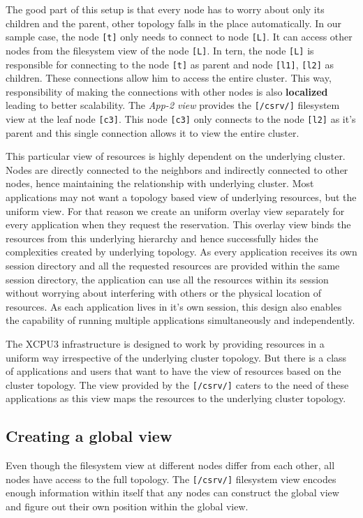 The good part of this setup is that every node has to worry about only its children
and the parent, other topology falls in the place automatically. In our sample case, 
the node \texttt{[t]} only needs to connect to node \texttt{[L]}.  It can access other nodes
from the filesystem view of the node \texttt{[L]}.  In tern, the node \texttt{[L]} is responsible
for connecting to the node \texttt{[t]} as parent and node \texttt{[l1]}, \texttt{[l2]} as
children.  These connections allow him to access the entire cluster.  This way, 
responsibility of making the connections with other nodes is also \textbf{localized}
leading to better scalability.  The \textit{App-2 view} provides the \texttt{[/csrv/]} 
filesystem view at the leaf node \texttt{[c3]}.  This node \texttt{[c3]} only connects 
to the node \texttt{[l2]} as it's parent and this single connection allows it to view 
the entire cluster.


This particular view of resources is highly dependent on the underlying cluster.
Nodes are directly connected to the neighbors and indirectly connected to other
nodes, hence maintaining the relationship with underlying cluster.  Most
applications may not want a topology based view of underlying resources, but
the uniform view.  For that reason we create an uniform overlay view separately
for every application when they request the reservation.  This overlay view
binds the resources from this underlying hierarchy and hence successfully hides
the complexities created by underlying topology.  As every application receives
its own session directory and all the requested resources are provided within
the same session directory, the application can use all the resources within
its session without worrying about interfering with others or the physical
location of resources.  As each application lives in it's own session, this
design also enables the capability of running multiple applications
simultaneously and independently. 

The XCPU3 infrastructure is designed to work by providing resources in a uniform
way irrespective of the underlying cluster topology.  But there is a class of
applications and users that want to have the view of resources based on the
cluster topology. The view provided by the \texttt{[/csrv/]} caters to the need
of these applications as this view maps the resources to the underlying cluster
topology.


\subsection{Creating a global view}
Even though the filesystem view at different nodes differ from each other, 
all nodes have access to the full topology.  The \texttt{[/csrv/]} filesystem view 
encodes enough information within itself that any nodes can construct the global view 
and figure out their own position within the global view.


